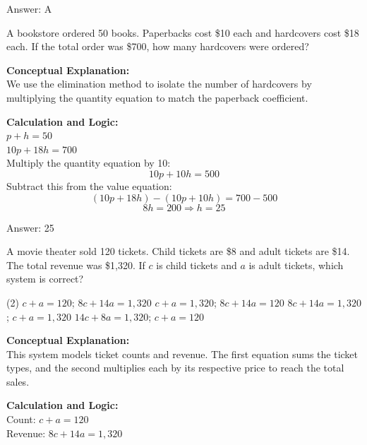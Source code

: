 \documentclass[11pt,paper=a4,answers]{exam}
\begin{document}
\begin{questions}
\begin{solution}
\vspace{15pt}
Answer: \colorbox{yellow!100}{A}
\end{solution}

\question
A bookstore ordered 50 books. Paperbacks cost \$10 each and hardcovers cost \$18 each. If the total order was \$700, how many hardcovers were ordered?

\begin{solution}
\textbf{Conceptual Explanation:} \\
We use the elimination method to isolate the number of hardcovers by multiplying the quantity equation to match the paperback coefficient.

\vspace{10pt}
\textbf{Calculation and Logic:} \\
$p + h = 50$ \\
$10p + 18h = 700$ \\
Multiply the quantity equation by 10:
\[10p + 10h = 500\]
Subtract this from the value equation:
\[(10p + 18h) - (10p + 10h) = 700 - 500\]
\[8h = 200 \Rightarrow h = 25\]

\vspace{15pt}
Answer: \colorbox{yellow!100}{25}
\end{solution}

\question
A movie theater sold 120 tickets. Child tickets are \$8 and adult tickets are \$14. The total revenue was \$1,320. If $c$ is child tickets and $a$ is adult tickets, which system is correct?
\begin{tasks}(2)
    \task $c + a = 120$; $8c + 14a = 1,320$
    \task $c + a = 1,320$; $8c + 14a = 120$
    \task $8c + 14a = 1,320$; $c + a = 1,320$
    \task $14c + 8a = 1,320$; $c + a = 120$
\end{tasks}

\begin{solution}
\textbf{Conceptual Explanation:} \\
This system models ticket counts and revenue. The first equation sums the ticket types, and the second multiplies each by its respective price to reach the total sales.

\vspace{10pt}
\textbf{Calculation and Logic:} \\
Count: $c + a = 120$ \\
Revenue: $8c + 14a = 1,320$


\end{solution}
\end{questions}
\end{document}
